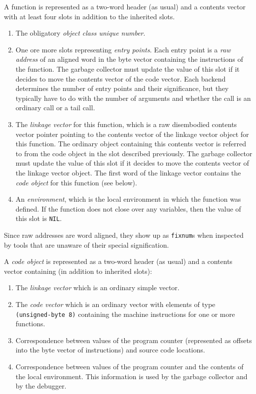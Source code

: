 A function is represented as a two-word header (as usual) and a
contents vector with at least four slots in addition to the inherited
slots.

\begin{enumerate}
\item The obligatory \emph{object class unique number}.
\item One ore more slots representing \emph{entry points}.  Each entry
  point is a \emph{raw address} of an aligned word in the byte vector
  containing the instructions of the function.  The garbage collector
  must update the value of this slot if it decides to move the
  contents vector of the code vector.  Each backend determines the number
  of entry points and their significance, but they typically have to
  do with the number of arguments and whether the call is an ordinary
  call or a tail call.
\item The \emph{linkage vector} for this function, which is a raw
  disembodied contents vector pointer pointing to the contents vector
  of the linkage vector object for this function.  The ordinary \cl{}
  object containing this contents vector is referred to from the code
  object in the slot described previously.  The garbage collector must
  update the value of this slot if it decides to move the contents
  vector of the linkage vector object.  The first word of the linkage
  vector contains the \emph{code object} for this function (see below).
\item An \emph{environment}, which is the local environment in which
  the function was defined. If the function does not close over any
  variables, then the value of this slot is \texttt{NIL}.
\end{enumerate}

Since raw addresses are word aligned, they show up as \texttt{fixnum}s
when inspected by tools that are unaware of their special
signification.  

A \emph{code object} is represented as a two-word header (as usual)
and a contents vector containing (in addition to inherited slots):

\begin{enumerate}
\item The \emph{linkage vector} which is an ordinary \cl{} simple
  vector.
\item The \emph{code vector} which is an ordinary \cl{} vector with
  elements of type \texttt{(unsigned-byte 8)} containing the machine
  instructions for one or more functions.
\item Correspondence between values of the program counter
  (represented as offsets into the byte vector of instructions) and
  source code locations.  
\item Correspondence between values of the program counter and the
  contents of the local environment.  This information is used by the
  garbage collector and by the debugger. 
\end{enumerate}

